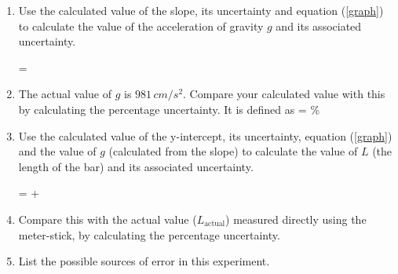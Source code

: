 \documentclass{article}
\begin{document}
      \begin{enumerate}

         \item Use the calculated value of the slope, its uncertainty and equation (\ref{graph}) to calculate the value of the acceleration of gravity $g$ and its associated uncertainty.

            \beqn
                = 
            \eeqn
         
         \item The actual value of $g$ is $981 \, cm/s^2$. Compare your calculated value with this by calculating the percentage uncertainty. It is defined as
         \beq
          =   \%
         \eeq

      \item Use the calculated value of the y-intercept, its uncertainty, equation (\ref{graph}) and the value of $g$ (calculated from the slope) to calculate the value of $L$ (the length of the bar) and its associated uncertainty.

            \beqn
                =   +  
            \eeqn

         \item Compare this with the actual value ($L_\text{actual}$) measured directly using the meter-stick, by calculating the percentage uncertainty.

         \item List the possible sources of error in this experiment.

   \end{enumerate}
\end{document}
